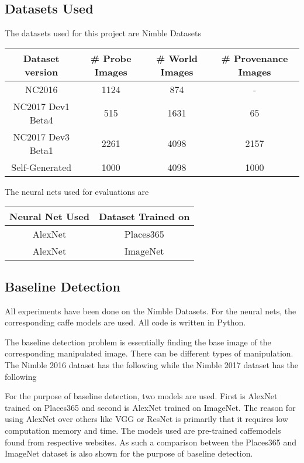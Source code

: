 \documentclass{article}
\begin{document}
\subsection{Datasets Used}
The datasets used for this project are Nimble Datasets
\begin{center}
  \begin{tabular}{| c | c | c | c |}
    \hline
    Dataset version & \# Probe Images & \# World Images & \# Provenance Images\\
    \hline
    NC2016 & 1124 & 874 & - \\
    \hline
    NC2017 Dev1 Beta4 & 515 & 1631 & 65 \\
    \hline
    NC2017 Dev3 Beta1 & 2261 & 4098 & 2157 \\
    \hline
    Self-Generated & 1000 & 4098 & 1000 \\
    \hline
  \end{tabular}
\end{center}

The neural nets used for evaluations are
\begin{center}
  \begin{tabular}{|c|c|}
    \hline
    Neural Net Used & Dataset Trained on \\
    \hline
    AlexNet & Places365 \\
    \hline
    AlexNet & ImageNet \\
    \hline
  \end{tabular}
\end{center}
\subsection{Baseline Detection}
All experiments have been done on the Nimble Datasets. For the neural nets, the corresponding caffe models are used. All code is written in Python.

The baseline detection problem is essentially finding the base image of the corresponding manipulated image. There can be different types of manipulation. The Nimble 2016 dataset has the following
while the Nimble 2017 dataset has the following

For the purpose of baseline detection, two models are used. First is AlexNet trained on Places365 and second is AlexNet trained on ImageNet. The reason for using AlexNet over others like VGG or ResNet is primarily that it requires low computation memory and time. The models used are pre-trained caffemodels found from respective websites. %
As such a comparison between the Places365 and ImageNet dataset is also shown for the purpose of baseline detection.
\end{document}
